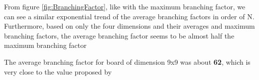 From figure \ref{fig:BranchingFactor}, like with the maximum branching factor, we can see a similar exponential trend of the average branching factors in order of N. Furthermore, based on only the four dimensions and their averages and maximum branching factors, the average branching factor seems to be almost half the maximum branching factor

The average branching factor for board of dimension 9x9 was about \textbf{62}, which is very close to the value proposed by \cite{Glendenning2002MasteringQ}